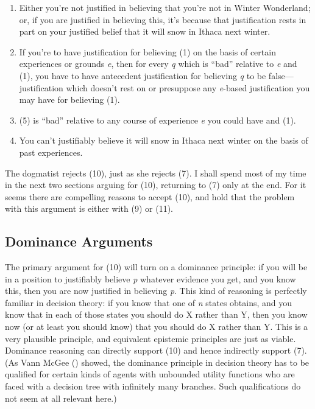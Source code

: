\documentclass[
  11pt,
  letterpaper,
  DIV=11,
  numbers=noendperiod,
  oneside]{scrartcl}
\begin{document}
\begin{enumerate}
\def\labelenumi{\arabic{enumi}.}
\setcounter{enumi}{8}
\item
  Either you're not justified in believing that you're not in Winter
  Wonderland; or, if you are justified in believing this, it's because
  that justification rests in part on your justified belief that it will
  snow in Ithaca next winter.
\item
  If you're to have justification for believing (1) on the basis of
  certain experiences or grounds \emph{e}, then for every \emph{q} which
  is ``bad'' relative to \emph{e} and (1), you have to have antecedent
  justification for believing \emph{q} to be false---justification which
  doesn't rest on or presuppose any \emph{e}-based justification you may
  have for believing (1).
\item
  (5) is ``bad'' relative to any course of experience \emph{e} you could
  have and (1).
\item
  You can't justifiably believe it will snow in Ithaca next winter on
  the basis of past experiences.
\end{enumerate}

The dogmatist rejects (10), just as she rejects (7). I shall spend most
of my time in the next two sections arguing for (10), returning to (7)
only at the end. For it seems there are compelling reasons to accept
(10), and hold that the problem with this argument is either with (9) or
(11).

\subsection{Dominance Arguments}\label{dominance-arguments}

The primary argument for (10) will turn on a dominance principle: if you
will be in a position to justifiably believe \emph{p} whatever evidence
you get, and you know this, then you are now justified in believing
\emph{p}. This kind of reasoning is perfectly familiar in decision
theory: if you know that one of \emph{n} states obtains, and you know
that in each of those states you should do X rather than Y, then you
know now (or at least you should know) that you should do X rather than
Y. This is a very plausible principle, and equivalent epistemic
principles are just as viable. Dominance reasoning can directly support
(10) and hence indirectly support (7). (As Vann McGee
() showed, the dominance principle in
decision theory has to be qualified for certain kinds of agents with
unbounded utility functions who are faced with a decision tree with
infinitely many branches. Such qualifications do not seem at all
relevant here.)
\end{document}
